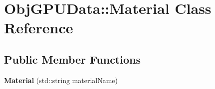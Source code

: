\hypertarget{class_obj_g_p_u_data_1_1_material}{}\section{Obj\+G\+P\+U\+Data\+:\+:Material Class Reference}
\label{class_obj_g_p_u_data_1_1_material}
\subsection*{Public Member Functions}
\begin{DoxyCompactItemize}
\item 
{\bfseries Material} (std\+::string material\+Name)\hypertarget{class_obj_g_p_u_data_1_1_material_abebac09d7ee98edf5a7881c5ee0b0e15}{}\label{class_obj_g_p_u_data_1_1_material_abebac09d7ee98edf5a7881c5ee0b0e15}

\end{DoxyCompactItemize}

